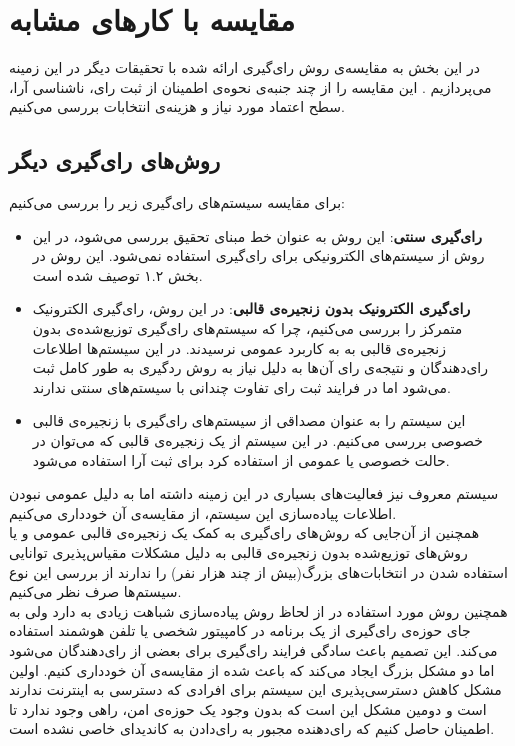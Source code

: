 \section{مقایسه با کارهای مشابه}
در این بخش به مقایسه‌‌ی روش رای‌گیری ارائه شده با تحقیقات دیگر در این زمینه می‌پردازیم . این مقایسه را از چند جنبه‌ی نحوه‌ی اطمینان از ثبت رای، ناشناسی آرا،  سطح اعتماد مورد نیاز و  هزینه‌ی انتخابات بررسی می‌کنیم. 
\subsection{روش‌های رای‌گیری دیگر}
برای مقایسه سیستم‌های رای‌گیری زیر را بررسی می‌کنیم:
\begin{itemize}
	\item 
	\textbf{رای‌گیری سنتی}:
	این روش به عنوان خط مبنای تحقیق بررسی می‌شود، در این روش از سیستم‌های الکترونیکی برای رای‌گیری استفاده نمی‌شود. این روش در بخش ۱.۲ توصیف شده است. 
	\item \textbf{رای‌‌گیری الکترونیک بدون زنجیره‌ی قالبی}:
	در این روش، رای‌گیری الکترونیک متمرکز را بررسی می‌کنیم، چرا که سیستم‌های رای‌گیری توزیع‌شده‌ی بدون زنجیره‌ی قالبی به به کاربرد عمومی نرسیدند. در این سیستم‌ها اطلاعات رای‌دهندگان و نتیجه‌ی رای آن‌ها به دلیل نیاز به روش ردگیری به طور کامل ثبت می‌شود اما در فرایند ثبت رای تفاوت چندانی با سیستم‌های سنتی ندارند.
 	\item \textbf{}
 	این سیستم را به عنوان مصداقی از سیستم‌های رای‌گیری با زنجیره‌ی قالبی خصوصی بررسی می‌کنیم. 
 	در این سیستم از یک‌ زنجیره‌ی قالبی که می‌توان در حالت خصوصی یا عمومی از استفاده کرد برای ثبت آرا استفاده می‌شود. 
\end{itemize}
\par
 	 سیستم‌ معروف  نیز فعالیت‌های بسیاری در این زمینه داشته اما به دلیل عمومی نبودن اطلاعات پیاده‌سازی این سیستم‌، از مقایسه‌ی آن خود‌داری می‌کنیم. 
 	 \\
 	 همچنین از آن‌جایی که روش‌های رای‌گیری به کمک یک زنجیره‌ی قالبی عمومی و یا روش‌های توزیع‌شده بدون زنجیره‌ی قالبی به دلیل مشکلات مقیاس‌پذیری توانایی استفاده شدن در انتخابات‌های بزرگ(بیش از چند هزار نفر) را ندارند از بررسی این نوع سیستم‌ها صرف نظر می‌کنیم.
 	 \\
 	 همچنین روش مورد استفاده در  از لحاظ روش پیاده‌سازی شباهت زیادی به  دارد ولی به جای حوزه‌ی رای‌گیری از یک برنامه در کامپیتور شخصی یا تلفن هوشمند استفاده می‌کند. این تصمیم باعث سادگی فرایند رای‌گیری برای بعضی از رای‌دهندگان می‌شود اما دو مشکل بزرگ ایجاد می‌کند که باعث شده از مقایسه‌ی آن خودداری کنیم. اولین مشکل کاهش دسترسی‌پذیری این سیستم برای افرادی که دسترسی به اینترنت ندارند است و دومین مشکل این است که بدون وجود یک حوزه‌ی امن، راهی وجود ندارد تا اطمینان حاصل کنیم که رای‌دهنده مجبور به رای‌دادن به کاندیدای خاصی نشده است.

